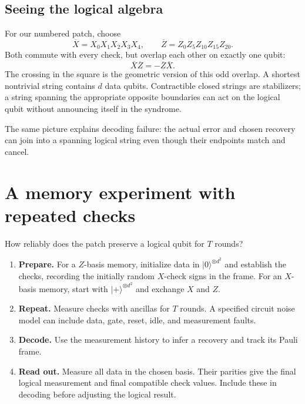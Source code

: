 \documentclass[11pt,a4paper]{article}
\newcommand{\ket}[1]{\lvert #1\rangle}
\newcommand{\XL}{\overline{X}}
\newcommand{\ZL}{\overline{Z}}
\begin{document}
\subsection*{Seeing the logical algebra}
For our numbered patch, choose
\[
\XL=X_0X_1X_2X_3X_4,
\qquad
\ZL=Z_0Z_5Z_{10}Z_{15}Z_{20}.
\]
Both commute with every check, but overlap each other on exactly one qubit:
\[
\XL\ZL=-\ZL\XL.
\]
The crossing in the square is the geometric version of this odd overlap. A shortest nontrivial string contains $d$ data qubits. Contractible closed strings are stabilizers; a string spanning the appropriate opposite boundaries can act on the logical qubit without announcing itself in the syndrome.

The same picture explains decoding failure: the actual error and chosen recovery can join into a spanning logical string even though their endpoints match and cancel.

\newpage
\section{A memory experiment with repeated checks}

How reliably does the patch preserve a logical qubit for $T$ rounds?

\begin{enumerate}
\item \textbf{Prepare.} For a $Z$-basis memory, initialize data in $\ket{0}^{\otimes d^2}$ and establish the checks, recording the initially random $X$-check signs in the frame. For an $X$-basis memory, start with $\ket{+}^{\otimes d^2}$ and exchange $X$ and $Z$.
\item \textbf{Repeat.} Measure checks with ancillas for $T$ rounds. A specified circuit noise model can include data, gate, reset, idle, and measurement faults.
\item \textbf{Decode.} Use the measurement history to infer a recovery and track its Pauli frame.
\item \textbf{Read out.} Measure all data in the chosen basis. Their parities give the final logical measurement and final compatible check values. Include these in decoding before adjusting the logical result.
\end{enumerate}

\begin{center}
\memorydiagram
{}
\end{center}
\end{document}
